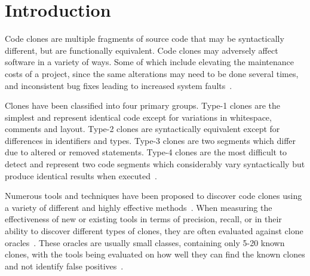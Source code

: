 \documentclass{sig-alternate}
\newcommand{\todo}[1]{\textcolor{cyan}{\textbf{[#1]}}}
\begin{document}





\section{Introduction}


Code clones are multiple fragments of source code that may be syntactically different, but are functionally equivalent. Code clones may adversely affect software in a variety of ways. Some of which include elevating the maintenance costs of a project, since the same alterations may need to be done several times, and inconsistent bug fixes leading to increased system faults~\cite{Roy:2009:CEC:1530898.1531101}.

Clones have been classified into four primary groups. Type-1 clones are the simplest and represent identical code except for variations in whitespace, comments and layout. Type-2 clones are syntactically equivalent except for differences in identifiers and types. Type-3 clones are two segments which differ due to altered or removed statements. Type-4 clones are the most difficult to detect and represent two code segments which considerably vary syntactically but produce identical results when executed~\cite{Roy:2009:CEC:1530898.1531101}.

Numerous tools and techniques have been proposed to discover code clones using a variety of different and highly effective methods~\cite{Roy:2009:CEC:1530898.1531101}. When measuring the effectiveness of new or existing tools in terms of precision, recall, or in their ability to discover different types of clones, they are often evaluated against clone oracles~\cite{Kim:2011:MMC:1985793.1985835, Lavoie:2011:ATC:1985404.1985411}. These oracles are usually small classes, containing only 5-20 known clones, with the tools being evaluated on how well they can find the known clones and not identify false positives~\cite{Kraw2012}.
\end{document}
